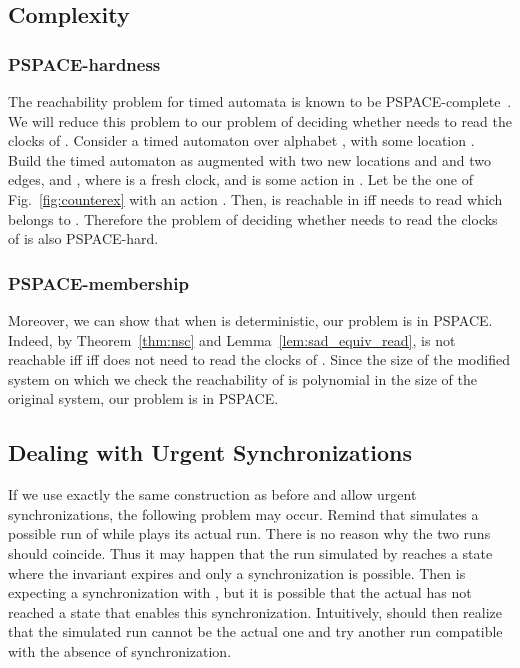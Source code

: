 \documentclass{LMCS}
\theoremstyle{plain}\newtheorem*{prop11}{Proposition~\ref{prop:states} bis}
\begin{document}
\subsection{Complexity}
\subsubsection*{\textsf{PSPACE}-hardness}
The reachability problem for timed automata is known to be
\textsf{PSPACE}-complete~\cite{AD90}. We will reduce this problem to our problem
of deciding whether  needs to read the clocks of .
Consider a timed automaton  over alphabet ,
with some location . Build the timed
automaton  as  augmented with two new locations  and 
and two edges,  and
, where  is a fresh clock, and
 is some action in .
Let  be the one of Fig.~\ref{fig:counterex} with an action .
Then,  is reachable in  iff  needs to
read  which belongs to . Therefore the problem of deciding whether
 needs to read the clocks of  is also \textsf{PSPACE}-hard.

\subsubsection*{\textsf{PSPACE}-membership}
Moreover, we can show that when  is deterministic, our problem is in
\textsf{PSPACE}. Indeed, by Theorem~\ref{thm:nsc} and
Lemma~\ref{lem:sad_equiv_read},  is not reachable iff
 iff  does not need to read the clocks of .
Since the size of the modified system on which we check the reachability of
 is polynomial in the size of the original system, our problem is in
\textsf{PSPACE}.


\subsection{Dealing with Urgent Synchronizations}
\label{subsec:general}

If we use exactly the same construction as before and allow urgent
synchronizations, the following problem may occur. Remind that 
simulates a possible run of  while  plays its actual run. There is
no reason why the two runs should coincide. Thus it may happen that the run
simulated by  reaches a state where the invariant expires and only a
synchronization is possible. Then  is expecting a synchronization with
, but it is possible that the actual  has not reached a state
that enables this synchronization. Intuitively,
 should then realize that the simulated run cannot be the actual one and
try another run compatible with the absence of synchronization.
\end{document}
